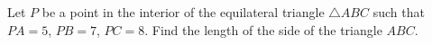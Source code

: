 Let $ P$ be a point in the interior of the equilateral triangle $ \triangle{}ABC$ such that $ PA = 5$,  $ PB = 7$,  $ PC = 8$. Find the length of the side of the triangle $ ABC$.